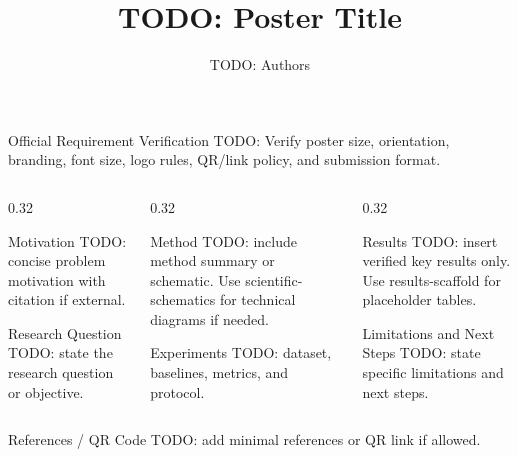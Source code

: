 \documentclass[final]{beamer}
\title{TODO: Poster Title}
\author{TODO: Authors}
\institute{TODO: Affiliation}
\begin{document}
\begin{frame}[t]

\begin{block}{Official Requirement Verification}
TODO: Verify poster size, orientation, branding, font size, logo rules, QR/link policy, and submission format.
\end{block}

\begin{columns}[t]

\begin{column}{0.32\textwidth}
\begin{block}{Motivation}
TODO: concise problem motivation with citation if external.
\end{block}

\begin{block}{Research Question}
TODO: state the research question or objective.
\end{block}
\end{column}

\begin{column}{0.32\textwidth}
\begin{block}{Method}
TODO: include method summary or schematic. Use scientific-schematics for technical diagrams if needed.
\end{block}

\begin{block}{Experiments}
TODO: dataset, baselines, metrics, and protocol.
\end{block}
\end{column}

\begin{column}{0.32\textwidth}
\begin{block}{Results}
TODO: insert verified key results only. Use results-scaffold for placeholder tables.
\end{block}

\begin{block}{Limitations and Next Steps}
TODO: state specific limitations and next steps.
\end{block}
\end{column}

\end{columns}

\begin{block}{References / QR Code}
TODO: add minimal references or QR link if allowed.
\end{block}

\end{frame}
\end{document}

